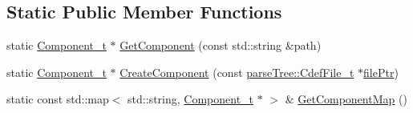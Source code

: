 \subsection*{Static Public Member Functions}
\begin{DoxyCompactItemize}
\item 
static \hyperlink{structmodel_1_1_component__t}{Component\+\_\+t} $\ast$ \hyperlink{structmodel_1_1_component__t_a290f756d5759ac759bc29b36f71860f6}{Get\+Component} (const std\+::string \&path)
\item 
static \hyperlink{structmodel_1_1_component__t}{Component\+\_\+t} $\ast$ \hyperlink{structmodel_1_1_component__t_a9c1663c0f19d525d57679f2dadf97c44}{Create\+Component} (const \hyperlink{structparse_tree_1_1_cdef_file__t}{parse\+Tree\+::\+Cdef\+File\+\_\+t} $\ast$\hyperlink{update_daemon_8c_acf1f3d914b42896a64e8683abe22ae7a}{file\+Ptr})
\item 
static const std\+::map$<$ std\+::string, \hyperlink{structmodel_1_1_component__t}{Component\+\_\+t} $\ast$ $>$ \& \hyperlink{structmodel_1_1_component__t_a0c08ea593c884dea5b2d5e3cca8a5324}{Get\+Component\+Map} ()
\end{DoxyCompactItemize}
